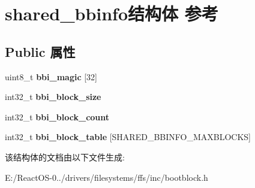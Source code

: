 \hypertarget{structshared__bbinfo}{}\section{shared\+\_\+bbinfo结构体 参考}
\label{structshared__bbinfo}
\subsection*{Public 属性}
\begin{DoxyCompactItemize}
\item 
\mbox{\label{structshared__bbinfo_a4ee6e341b22d2400b5055df15cb121aa}} 
uint8\+\_\+t {\bfseries bbi\+\_\+magic} \mbox{[}32\mbox{]}
\item 
\mbox{\label{structshared__bbinfo_a3c6165c5506881dae60af48cc56f225a}} 
int32\+\_\+t {\bfseries bbi\+\_\+block\+\_\+size}
\item 
\mbox{\label{structshared__bbinfo_adf903668c96deb0bb22247f5b2390f1b}} 
int32\+\_\+t {\bfseries bbi\+\_\+block\+\_\+count}
\item 
\mbox{\label{structshared__bbinfo_ac7f1f3520c826f0c9d693ea678282279}} 
int32\+\_\+t {\bfseries bbi\+\_\+block\+\_\+table} \mbox{[}S\+H\+A\+R\+E\+D\+\_\+\+B\+B\+I\+N\+F\+O\+\_\+\+M\+A\+X\+B\+L\+O\+C\+KS\mbox{]}
\end{DoxyCompactItemize}


该结构体的文档由以下文件生成\+:\begin{DoxyCompactItemize}
\item 
E\+:/\+React\+O\+S-\/0../drivers/filesystems/ffs/inc/bootblock.\+h\end{DoxyCompactItemize}

